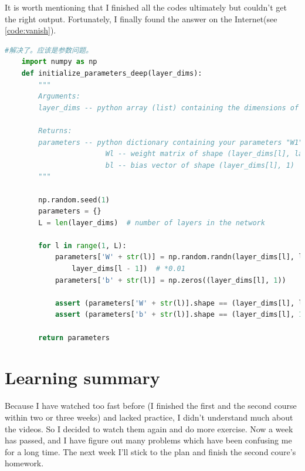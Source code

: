\documentclass[10pt]{article}
\begin{document}
\indent It is worth mentioning that I finished all the codes ultimately but couldn't get the right output. Fortunately, I finally found the answer on the Internet(see \autoref{code:vanish}). 



\begin{lstlisting}[language=Python,caption={The solution of vanishing gradients},label={code:vanish}]
    #解决了。应该是参数问题。  
    import numpy as np
    def initialize_parameters_deep(layer_dims):  
        """ 
        Arguments: 
        layer_dims -- python array (list) containing the dimensions of each layer in our network 
     
        Returns: 
        parameters -- python dictionary containing your parameters "W1", "b1", ..., "WL", "bL": 
                        Wl -- weight matrix of shape (layer_dims[l], layer_dims[l-1]) 
                        bl -- bias vector of shape (layer_dims[l], 1) 
        """  
      
        np.random.seed(1)  
        parameters = {}  
        L = len(layer_dims)  # number of layers in the network  
      
        for l in range(1, L):  
            parameters['W' + str(l)] = np.random.randn(layer_dims[l], layer_dims[l - 1]) / np.sqrt(  
                layer_dims[l - 1])  # *0.01  
            parameters['b' + str(l)] = np.zeros((layer_dims[l], 1))  
      
            assert (parameters['W' + str(l)].shape == (layer_dims[l], layer_dims[l - 1]))  
            assert (parameters['b' + str(l)].shape == (layer_dims[l], 1))  
      
        return parameters  
\end{lstlisting}

\section{Learning summary}

\indent Because I have watched too fast before (I finished the first and the second course within two or three weeks) and lacked practice, I didn't understand much about the videos. So I decided to watch them again and do more exercise. Now a week has passed, and I have figure out many problems which have been confusing me for a long time. The next week I'll stick to the plan and finish the second coure's homework.
\end{document}
